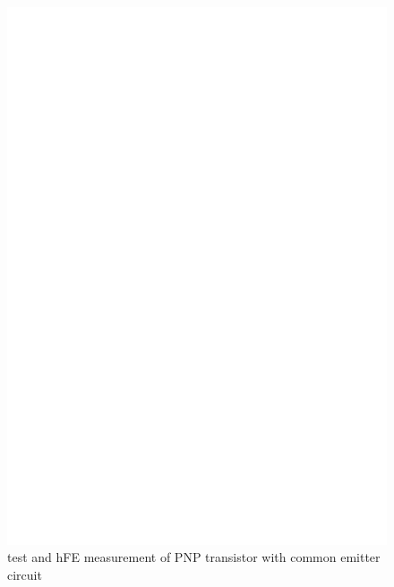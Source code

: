 \begin{figure}[H]
\centering
\includegraphics[]{../FIG/PNPce.eps}
\caption{test and hFE measurement of PNP transistor with common emitter circuit }
\label{fig:pnpce}
\end{figure}

